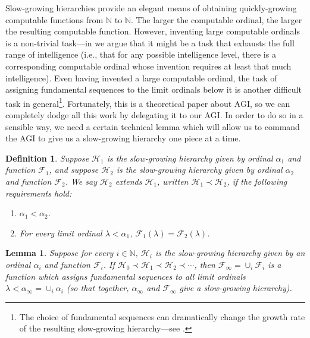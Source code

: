 \documentclass{article}
\newtheorem{definition}[theorem]{Definition}
\newtheorem{lemma}[theorem]{Lemma}
\begin{document}
Slow-growing hierarchies provide an elegant means of obtaining quickly-growing
computable functions from $\mathbb N$ to $\mathbb N$.
The larger the computable ordinal, the larger the resulting computable function.
However, inventing large computable ordinals is a non-trivial task---in
\cite{ioi2} we argue that it might be a task that exhausts the full range
of intelligence (i.e., that for any possible intelligence level, there is a corresponding
computable ordinal whose invention requires at least that much intelligence).
Even having invented a large computable ordinal, the task of assigning fundamental
sequences to the limit ordinals below it is another difficult task in general\footnote{The
choice of fundamental sequences can dramatically change the growth rate of the
resulting slow-growing hierarchy---see \cite{weiermann1997sometimes}.}.
Fortunately, this is a theoretical paper about AGI, so we can completely dodge all this
work by delegating it to our AGI. In order to do so in a sensible way, we need a certain
technical lemma which will allow us to command the AGI to give us a slow-growing hierarchy
one piece at a time.

\begin{definition}
\label{fundamentalsequenceextensiondef}
    Suppose $\mathcal H_1$ is the slow-growing hierarchy given by
    ordinal $\alpha_1$ and function $\mathcal F_1$, and suppose
    $\mathcal H_2$ is the slow-growing hierarchy given by
    ordinal $\alpha_2$ and function $\mathcal F_2$.
    We say \emph{$\mathcal H_2$ extends $\mathcal H_1$},
    written $\mathcal H_1\prec \mathcal H_2$, if the following
    requirements hold:
    \begin{enumerate}
        \item
        $\alpha_1<\alpha_2$.
        \item
        For every limit ordinal $\lambda<\alpha_1$,
        $\mathcal F_1(\lambda)=\mathcal F_2(\lambda)$.
    \end{enumerate}
\end{definition}

\begin{lemma}
\label{slowgrowingtechnicallemma}
    Suppose for every $i\in\mathbb N$,
    $\mathcal H_i$ is the slow-growing hierarchy given by an ordinal
    $\alpha_i$ and function $\mathcal F_i$.
    If $\mathcal H_0\prec \mathcal H_1\prec \mathcal H_2\prec\cdots$,
    then
    $\mathcal F_\infty=\cup_i\mathcal F_i$ is a function which assigns
    fundamental sequences
    to all limit ordinals $\lambda<\alpha_\infty=\cup_i\alpha_i$
    (so that together, $\alpha_\infty$ and $\mathcal F_\infty$
    give a slow-growing hierarchy).
\end{lemma}
\end{document}
